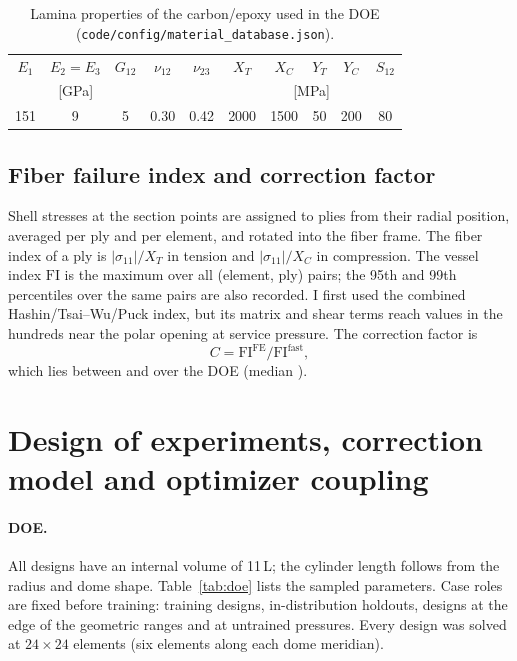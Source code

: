 \documentclass[11pt]{article}
\newcommand{\FI}{\mathrm{FI}}
\begin{document}
\begin{table}[t]
\centering
\caption{Lamina properties of the carbon/epoxy used in the DOE (\texttt{code/config/material\_database.json}).}
\label{tab:material}
\begin{tabular}{cccccccccc}
\toprule
$E_1$ & $E_2=E_3$ & $G_{12}$ & $\nu_{12}$ & $\nu_{23}$ & $X_T$ & $X_C$ & $Y_T$ & $Y_C$ & $S_{12}$ \\
\multicolumn{3}{c}{[GPa]} & & & \multicolumn{5}{c}{[MPa]} \\
\midrule
151 & 9 & 5 & 0.30 & 0.42 & 2000 & 1500 & 50 & 200 & 80 \\
\bottomrule
\end{tabular}
\end{table}

\subsection{Fiber failure index and correction factor}
Shell stresses at the section points are assigned to plies from their radial position, averaged per ply and per element, and rotated into the fiber frame. The fiber index of a ply is $|\sigma_{11}|/X_T$ in tension and $|\sigma_{11}|/X_C$ in compression. The vessel index $\FI$ is the maximum over all (element, ply) pairs; the 95th and 99th percentiles over the same pairs are also recorded. I first used the combined Hashin/Tsai--Wu/Puck index, but its matrix and shear terms reach values in the hundreds near the polar opening at service pressure. The correction factor is
\begin{equation}
C = \FI^{\mathrm{FE}} / \FI^{\mathrm{fast}},
\end{equation}
which lies between \Cmin{} and \Cmax{} over the DOE (median \Cmedian{}).

\section{Design of experiments, correction model and optimizer coupling}

\paragraph{DOE.} All designs have an internal volume of 11\,L; the cylinder length follows from the radius and dome shape. Table~\ref{tab:doe} lists the sampled parameters. Case roles are fixed before training: \NtrainCases{} training designs, \NholdoutCases{} in-distribution holdouts, \NboundaryCases{} designs at the edge of the geometric ranges and \NpressureCases{} at untrained pressures. Every design was solved at $24\times24$ elements (six elements along each dome meridian).
\end{document}
